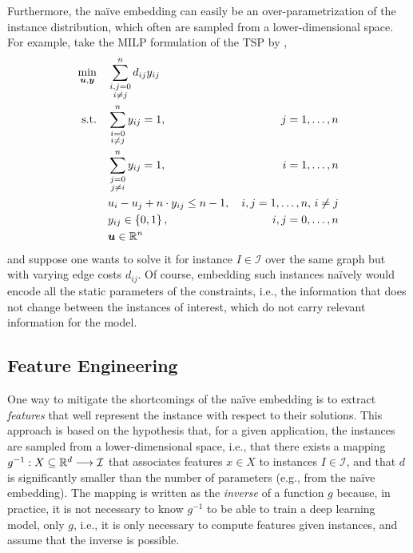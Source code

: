 Furthermore, the naïve embedding can easily be an over-parametrization of the instance distribution, which often are sampled from a lower-dimensional space.
For example, take the MILP formulation of the TSP by ,
\begin{align*}
    \min_{\bm{u},\bm{y}} \quad & \sum_{\substack{i,j=0 \\ i\neq j}}^{n} d_{ij} y_{ij} & \\
    \textrm{s.t.} \quad & \sum_{\substack{i=0\\i\neq j}}^{n} y_{ij} = 1, &\, j=1,\ldots,n \\
			& \sum_{\substack{j=0\\j\neq i}}^{n} y_{ij} = 1, &\, i=1,\ldots,n \\
			& u_i - u_j + n \cdot y_{ij} \le n - 1, &\, i,j=1,\ldots,n,\, i\neq j\\
			& y_{ij} \in \left\{ 0,1 \right\}, &\, i,j=0,\ldots,n  \\
			& \bm{u} \in \mathbb{R}^{n} &
\end{align*}
and suppose one wants to solve it for instance $I\in \mathcal{I}$ over the same graph but with varying edge costs $d_{ij}$.
Of course, embedding such instances naïvely would encode all the static parameters of the constraints, i.e., the information that does not change between the instances of interest, which do not carry relevant information for the model.


\subsection{Feature Engineering}

One way to mitigate the shortcomings of the naïve embedding is to extract \emph{features} that well represent the instance with respect to their solutions.
This approach is based on the hypothesis that, for a given application, the instances are sampled from a lower-dimensional space, i.e., that there exists a mapping $g^{-1}: X\subseteq\mathbb{R}^{d} \longrightarrow \mathcal{I}$ that associates features $x\in X$ to instances $I\in \mathcal{I}$, and that $d$ is significantly smaller than the number of parameters (e.g., from the naïve embedding).
The mapping is written as the \emph{inverse} of a function $g$ because, in practice, it is not necessary to know $g^{-1}$ to be able to train a deep learning model, only $g$, i.e., it is only necessary to compute features given instances, and assume that the inverse is possible.

